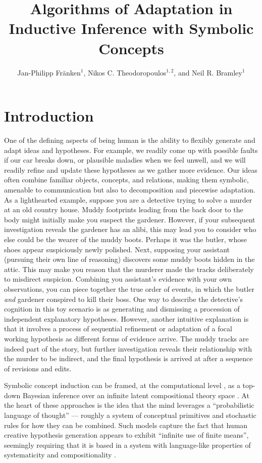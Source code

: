 \documentclass[doc,natbib,floatsintext]{apa7}
\title{Algorithms of Adaptation in Inductive Inference with Symbolic Concepts}
\author{Jan-Philipp Fränken$^{1}$, Nikos C. Theodoropoulos$^{1,2}$, and Neil R. Bramley$^1$}
\affiliation{$^1$ Department of Psychology, University of Edinburgh \\
            $^2$ Laboratory of Experimental Psychology, Suor Orsola Benincasa University of Naples}
\begin{document}
\setlength{\parindent}{2em}
\maketitle



\section{Introduction}
One of the defining aspects of being human is the ability to flexibly generate and adapt ideas and hypotheses. For example, we readily come up with possible faults if our car breaks down, or plausible maladies when we feel unwell, and we will readily refine and update these hypotheses as we gather more evidence. Our ideas often combine familiar objects, concepts, and relations, making them symbolic, amenable to communication but also to decomposition and piecewise adaptation. As a lighthearted example, suppose you are a detective trying to solve a murder at an old country house. Muddy footprints leading from the back door to the body might initially make you suspect the gardener. However, if your subsequent investigation reveals the gardener has an alibi, this may lead you to consider who else could be the wearer of the muddy boots. Perhaps it was the butler, whose shoes appear suspiciously newly polished. Next, supposing your assistant (pursuing their own line of reasoning) discovers some muddy boots hidden in the attic. This may make you reason that the murderer made the tracks deliberately to misdirect suspicion. Combining you assistant's evidence with your own observations, you can piece together the true order of events, in which the butler \emph{and} gardener conspired to kill their boss. One way to describe the detective's cognition in this toy scenario is as generating and dismissing a procession of independent explanatory hypotheses. However, another intuitive explanation is that it involves a process of sequential refinement or adaptation of a focal working hypothesis as different forms of evidence arrive. The muddy tracks are indeed part of the story, but further investigation reveals their relationship with the murder to be indirect, and the final hypothesis is arrived at after a sequence of revisions and edits. 

Symbolic concept induction can be framed, at the computational level \citep{marrfreeman}, as a top-down Bayesian inference over an infinite latent compositional theory space \citep{goodman2008rational, piantadosi2016logical,  bramley2018grounding}. At the heart of these approaches is the idea that the mind leverages a ``probabilistic language of thought'' --- roughly a system of conceptual primitives and stochastic rules for how they can be combined. Such models capture the fact that human creative hypothesis generation appears to exhibit ``infinite use of finite means'', seemingly requiring that it is based in a system with language-like properties of systematicity and compositionality \citep{fodor1975language, lake2015human}.
\end{document}
